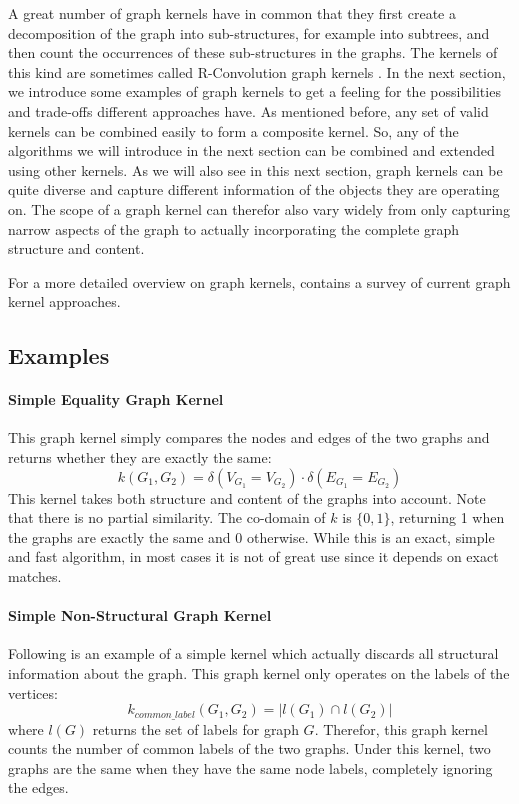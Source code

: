 A great number of graph kernels have in common that they first create a decomposition of the graph into sub-structures, for example into subtrees, and then count the occurrences of these sub-structures in the graphs.
The kernels of this kind are sometimes called R-Convolution graph kernels \cite{Namomsa1965a}.
In the next section, we introduce some examples of graph kernels to get a feeling for the possibilities and trade-offs different approaches have.
As mentioned before, any set of valid kernels can be combined easily to form a composite kernel.
So, any of the algorithms we will introduce in the next section can be combined and extended using other kernels.
As we will also see in this next section, graph kernels can be quite diverse and capture different information of the objects they are operating on.
The scope of a graph kernel can therefor also vary widely from only capturing narrow aspects of the graph to actually incorporating the complete graph structure and content.

For a more detailed overview on graph kernels, \cite{Gartner2003a} contains a survey of current graph kernel approaches.

\subsection{Examples}
\paragraph{Simple Equality Graph Kernel}
This graph kernel simply compares the nodes and edges of the two graphs and returns whether they are exactly the same:
\begin{equation*}
    k(G_1, G_2) = \delta(V_{G_1} = V_{G_2}) \cdot \delta(E_{G_1} = E_{G_2})
\end{equation*}
This kernel takes both structure and content of the graphs into account. Note that there is no partial similarity. The co-domain of $k$ is $\{0, 1\}$, returning 1 when the graphs are exactly the same and 0 otherwise.
While this is an exact, simple and fast algorithm, in most cases it is not of great use since it depends on exact matches.

\paragraph{Simple Non-Structural Graph Kernel}
Following is an example of a simple kernel which actually discards all structural information about the graph. This graph kernel only operates on the labels of the vertices:
\begin{equation*}
k_{common\_label}(G_1, G_2) = | l(G_1) \cap l(G_2) |
\end{equation*}
where $l(G)$ returns the set of labels for graph $G$.
Therefor, this graph kernel counts the number of common labels of the two graphs. Under this kernel, two graphs are the same when they have the same node labels, completely ignoring the edges.

